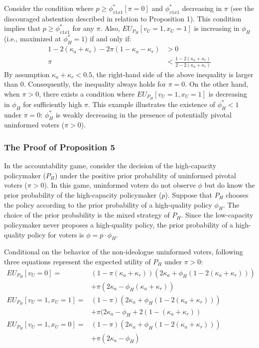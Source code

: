 \par Consider the condition where $p \geq \phi^*_{v1x1}[\pi=0]$ and $\phi^*_{v1x1}$ decreasing in $\pi$ (see the discouraged abstention described in relation to Proposition 1). This condition implies that $p \geq \phi^*_{v1x1}$ for any $\pi$. Also, $EU_{P_H}[v_U=1,x_U=1]$ is increasing in $\phi_H$ (i.e., maximized at $\phi^*_H=1$) if and only if:
\begin{align*}
1-2(\kappa_a+\kappa_r)-2\pi(1-\kappa_a-\kappa_r)&>0\\
\pi &< \frac{1-2(\kappa_a+\kappa_r)}{2-2(\kappa_a+\kappa_r)}
\end{align*}
\noindent By assumption $\kappa_a+\kappa_r<0.5$, the right-hand side of the above inequality is larger than $0$. Consequently, the inequality always holds for $\pi=0$. On the other hand, when $\pi>0$, there exists a condition where $EU_{P_H}[v_U=1,x_U=1]$ is decreasing in $\phi_H$ for sufficiently high $\pi$. This example illustrates the existence of $\phi^*_H<1$ under $\pi=0$: $\phi^*_H$ is weakly decreasing in the presence of potentially pivotal uninformed voters ($\pi>0$). 

\subsubsection{The Proof of Proposition 5}

\par In the accountability game, consider the decision of the high-capacity policymaker ($P_H$) under the positive prior probability of uninformed pivotal voters ($\pi>0$). In this game, uninformed voters do not observe $\phi$ but do know the prior probability of the high-capacity policymaker ($p$). Suppose that $P_H$ chooses the policy according to the prior probability of a high-quality policy $\phi_H$. The choice of the prior probability is the mixed strategy of $P_H$. Since the low-capacity policymaker never proposes a high-quality policy, the prior probability of a high-quality policy for voters is $\phi = p \cdot \phi_H$. 

\par Conditional on the behavior of the non-ideologue uninformed voters, following three equations represent the expected utility of $P_H$ under $\pi > 0$:
\begin{align*}
EU_{P_H}[v_U = 0] =& (1-\pi (\kappa_{a} + \kappa_{r})) (2 \kappa_{a} + \phi_H (1- 2(\kappa_{a} + \kappa_{r}))) \\ &+\pi (2 \kappa_{a} - \phi_H (\kappa_{a} + \kappa_{r}))  \\
EU_{P_H}[v_U = 1, x_U = 1] =& (1-\pi) (2 \kappa_{a} + \phi_H (1- 2(\kappa_{a} + \kappa_{r})))  \\ &+ \pi (2 \kappa_{a} - \phi_H + 2 (1- (\kappa_{a} + \kappa_{r}))  \\
EU_{P_H}[v_U = 1, x_U = 0] =& (1-\pi) (2 \kappa_{a} + \phi_H (1- 2(\kappa_{a} + \kappa_{r})))  \\ &+ \pi (2 \kappa_{a} - \phi_H) 
\end{align*}

